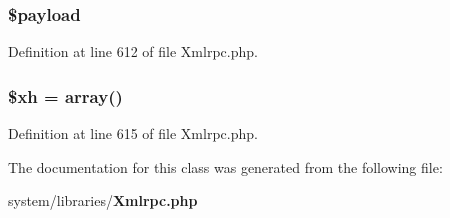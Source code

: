 \subsubsection[{\$payload}]{\setlength{\rightskip}{0pt plus 5cm}\$payload}\label{class_x_m_l___r_p_c___message_ab6c08f2335783abfa1bce5d22fb3466e}


Definition at line 612 of file Xmlrpc.\-php.

\subsubsection[{\$xh}]{\setlength{\rightskip}{0pt plus 5cm}\$xh = array()}\label{class_x_m_l___r_p_c___message_aad3b174789357e147f0daa5b69930ac8}


Definition at line 615 of file Xmlrpc.\-php.



The documentation for this class was generated from the following file\-:\begin{DoxyCompactItemize}
\item 
system/libraries/{\bf Xmlrpc.\-php}\end{DoxyCompactItemize}
